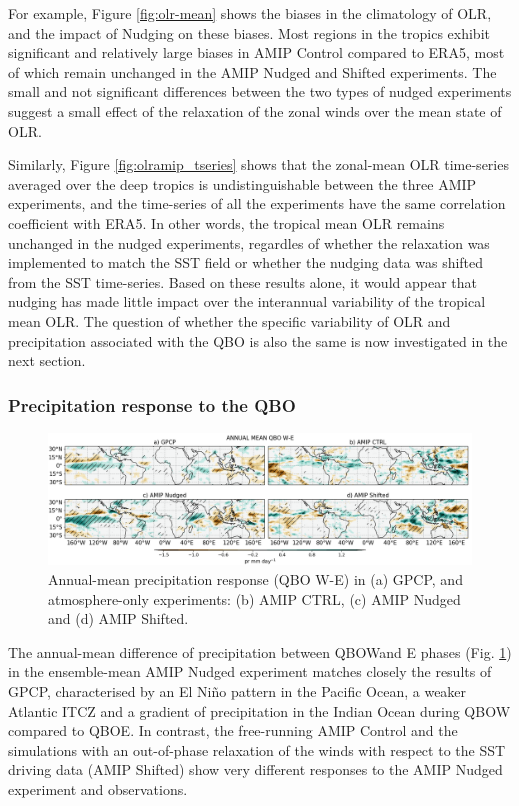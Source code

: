 For example, Figure \ref{fig:olr-mean} shows the biases in the climatology of OLR, and the impact of Nudging on these biases. Most regions in the tropics exhibit significant and relatively large biases in AMIP Control compared to ERA5, most of which remain unchanged in the AMIP Nudged and Shifted experiments. The small and not significant differences between the two types of nudged experiments suggest a small effect of the relaxation of the zonal winds over the mean state of OLR. 

Similarly, Figure \ref{fig:olramip_tseries} shows that the zonal-mean OLR time-series averaged over the deep tropics is undistinguishable between the three AMIP experiments, and the time-series of all the experiments have the same correlation coefficient with ERA5. In other words, the tropical mean OLR remains unchanged in the nudged experiments, regardles of whether the relaxation was implemented to match the SST field or whether the nudging data was shifted from the SST time-series. 
Based on these results alone, it would appear that nudging has made little impact over the interannual variability of the tropical mean OLR. The question of whether the specific variability of OLR and precipitation associated with the QBO is also the same is now investigated in the next section. 


\subsubsection{Precipitation response to the QBO}

\begin{figure}[t!]
\centering
 \includegraphics[width=\linewidth]{figures/pr_amip_climqbowqboe.png}
\caption[Annual mean precipitation response in atmosphere-only experiments]{Annual-mean precipitation response (QBO W-E) in (a) GPCP, and atmosphere-only experiments: (b) AMIP CTRL, (c) AMIP Nudged and (d) AMIP Shifted.  }
\label{fig:amip_clim}
\end{figure}


The annual-mean difference of precipitation between QBOWand E phases (Fig. \ref{fig:amip_clim}) in the ensemble-mean AMIP Nudged experiment matches closely the results of GPCP, characterised by an El Niño pattern in the Pacific Ocean, a weaker Atlantic ITCZ and a gradient of precipitation in the Indian Ocean during QBOW compared to QBOE. 
In contrast, the free-running AMIP Control and the simulations with an out-of-phase relaxation of the winds with respect to the SST driving data (AMIP Shifted) show very different responses to the AMIP Nudged experiment and observations. 

